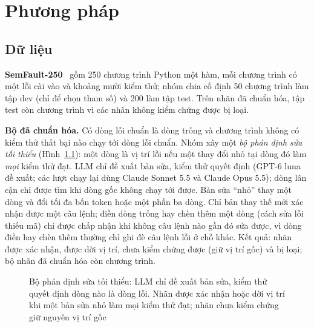 \chapter{Phương pháp}
\label{chap:phuong-phap}

\section{Dữ liệu}
\label{sec:du-lieu}

\textbf{SemFault-250}~\cite{yang2026semloc} gồm 250 chương trình Python một hàm, mỗi chương trình có một lỗi cài vào và
khoảng mười kiểm thử; nhóm chia cố định 50 chương trình làm tập dev (chỉ để chọn tham số) và 200 làm tập test. Trên nhãn
đã chuẩn hóa, tập test còn \RqTwoRepairedAllSemlocN{} chương trình vì các nhãn không kiểm chứng được bị loại.

\textbf{Bộ đã chuẩn hóa.} Có \GtBlankN{} dòng lỗi chuẩn là dòng trống và \GtNotExecutedN{} chương trình không có kiểm
thử thất bại nào chạy tới dòng lỗi chuẩn. Nhóm xây một \emph{bộ phán định sửa tối thiểu} (Hình~\ref{fig:sua-nhan}): một
dòng là vị trí lỗi nếu một thay đổi nhỏ tại dòng đó làm \emph{mọi} kiểm thử đạt. LLM chỉ đề xuất bản sửa, kiểm thử quyết
định (GPT-6 luna đề xuất; các lượt chạy lại dùng Claude Sonnet 5.5 và Claude Opus 5.5); dòng lân cận chỉ được tìm khi
dòng gốc không chạy tới được. Bản sửa ``nhỏ'' thay một dòng và đổi tối đa bốn token hoặc một phần ba dòng. Chỉ bản thay thế
mới xác nhận được một câu lệnh; điền dòng trống hay chèn thêm một dòng (cách sửa lỗi thiếu mã) chỉ được chấp nhận khi không
câu lệnh nào gần đó sửa được, vì dòng điền hay chèn thêm thường chỉ ghi đè câu lệnh lỗi ở chỗ khác. Kết quả: \GtConfirmedN{} nhãn được xác nhận,
\GtCorrectedN{} được dời vị trí, \GtUnverifiedN{} chưa kiểm chứng được (giữ vị trí gốc) và \GtUnverifiableN{} bị loại;
bộ nhãn đã chuẩn hóa còn \GtRepairedN{} chương trình.

\begin{figure}[H]\centering

\caption{Bộ phán định sửa tối thiểu: LLM chỉ đề xuất bản sửa, kiểm thử quyết định dòng nào là dòng lỗi. Nhãn được xác nhận hoặc dời vị trí khi một bản sửa nhỏ làm mọi kiểm thử đạt; nhãn chưa kiểm chứng giữ nguyên vị trí gốc}\label{fig:sua-nhan}
\end{figure}

